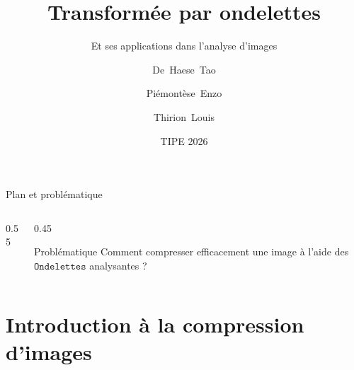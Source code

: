 \documentclass[10pt]{beamer}
\title{Transformée par ondelettes}
\subtitle{Et ses applications dans l'analyse d'images}
\author{De~Haese~Tao \and Piémontèse~Enzo \and Thirion~Louis}
\institute{Cité scolaire Carnot}
\date{TIPE 2026}
\begin{document}
	
	\begin{frame}
		\titlepage
	\end{frame}
	
	\begin{frame}{Plan et problématique}
		\begin{columns}[c] 
			
			\begin{column}{0.55\textwidth}
				\tableofcontents
			\end{column}
			
			\begin{column}{0.45\textwidth}
				\centering 
				
				\begin{minipage}{0.9\textwidth}
					\begin{alertblock}{Problématique}
						Comment compresser efficacement une image à l'aide des $\texttt{Ondelettes}$ analysantes ?
					\end{alertblock}
				\end{minipage}
				
			\end{column}
		\end{columns}
	\end{frame}
	
	\section{Introduction à la compression d'images}
	
\end{document}

